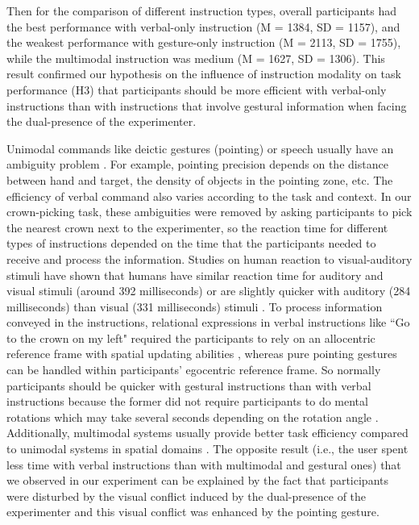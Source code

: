 Then for the comparison of different instruction types, overall participants had the best performance with verbal-only instruction (M = 1384, SD = 1157), and the weakest performance with gesture-only instruction (M = 2113, SD = 1755), while the multimodal instruction was medium (M = 1627, SD = 1306). This result confirmed our hypothesis on the influence of instruction modality on task performance (H3) that participants should be more efficient with verbal-only instructions than with instructions that involve gestural information when facing the dual-presence of the experimenter.

Unimodal commands like deictic gestures (pointing) or speech usually have an ambiguity problem \citep{Bangerter2004Using}. For example, pointing precision depends on the distance between hand and target, the density of objects in the pointing zone, etc. The efficiency of verbal command also varies according to the task and context. In our crown-picking task, these ambiguities were removed by asking participants to pick the nearest crown next to the experimenter, so the reaction time for different types of instructions depended on the time that the participants needed to receive and process the information. Studies on human reaction to visual-auditory stimuli have shown that humans have similar reaction time for auditory and visual stimuli (around 392 milliseconds) \citep{Suied2009Integration} or are slightly quicker with auditory (284 milliseconds) than visual (331 milliseconds) stimuli \citep{Shelton2010Comparison}. To process information conveyed in the instructions, relational expressions in verbal instructions like ``Go to the crown on my left" required the participants to rely on an allocentric reference frame with spatial updating abilities \citep{Riecke2007Spatial}, whereas pure pointing gestures can be handled within participants' egocentric reference frame. So normally participants should be quicker with gestural instructions than with verbal instructions because the former did not require participants to do mental rotations which may take several seconds depending on the rotation angle \citep{Shepard1971Mental}. Additionally, multimodal systems usually provide better task efficiency compared to unimodal systems in spatial domains \citep{Oviatt1999Ten}. The opposite result (i.e., the user spent less time with verbal instructions than with multimodal and gestural ones) that we observed in our experiment can be explained by the fact that participants were disturbed by the visual conflict induced by the dual-presence of the experimenter and this visual conflict was enhanced by the pointing gesture.

